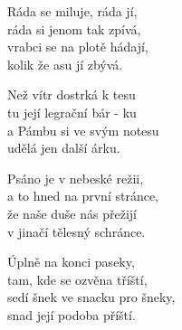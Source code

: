 

\cho{}
Ráda se miluje, ráda jí,\\
ráda si jenom tak zpívá,\\
vrabci se na plotě hádají,\\
kolik že asu jí zbývá. 

\ve{}
Než vítr dostrká k tesu\\
tu její legrační bár \quad{}- ku\\ 
a Pámbu si ve svým notesu\\
udělá jen další árku. 

\cho{}

\ve{}
Psáno je v nebeské režii,\\
a to hned na první stránce,\\
že naše duše nás přežijí\\
v jinačí tělesný schránce. 

\cho{}

\ve{}
Úplně na konci paseky,\\
tam, kde se ozvěna tříští,\\
sedí šnek ve snacku pro šneky,\\
snad její podoba příští. 

\cho{}

\esong